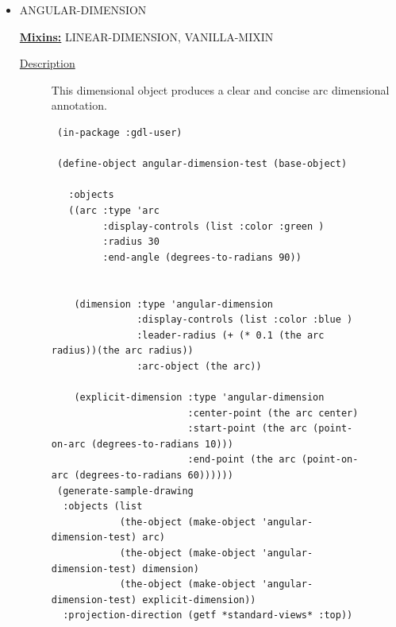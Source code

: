 \documentclass [11pt]{book}
\begin{document}
\begin{itemize}

\item {}ANGULAR-DIMENSION


\textbf{
\underline{Mixins:}} LINEAR-DIMENSION, VANILLA-MIXIN





\begin{description}

\item [
\underline{Description}]


This dimensional object produces a clear and concise arc dimensional annotation.



\end{description}




\begin{figure}
\begin{lrbox}{\boxedverb}
\begin{minipage}{\linewidth}
{\small

\begin{verbatim}
 (in-package :gdl-user)

 (define-object angular-dimension-test (base-object) 
   
   :objects 
   ((arc :type 'arc
         :display-controls (list :color :green )
         :radius 30
         :end-angle (degrees-to-radians 90))
    
    
    (dimension :type 'angular-dimension
               :display-controls (list :color :blue )
               :leader-radius (+ (* 0.1 (the arc radius))(the arc radius))
               :arc-object (the arc))
    
    (explicit-dimension :type 'angular-dimension
                        :center-point (the arc center)
                        :start-point (the arc (point-on-arc (degrees-to-radians 10)))
                        :end-point (the arc (point-on-arc (degrees-to-radians 60))))))
 (generate-sample-drawing 
  :objects (list 
            (the-object (make-object 'angular-dimension-test) arc) 
            (the-object (make-object 'angular-dimension-test) dimension)
            (the-object (make-object 'angular-dimension-test) explicit-dimension))
  :projection-direction (getf *standard-views* :top))
 
  
\end{verbatim}}
\end{minipage}
\end{lrbox}
\fbox{\usebox{\boxedverb}}


\end{figure}
\end{itemize}
\end{document}
